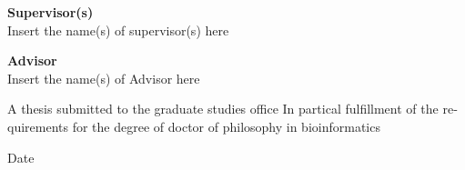 \documentclass[12pt]{report}
\begin{document}
\begin{latin}
{\begin{center}
\textbf{Supervisor(s)\\} Insert the name(s) of supervisor(s) here
\end{center}

\begin{center}
\textbf{Advisor\\} Insert the name(s) of Advisor here
\end{center}

}
\vfill
\begin{center}
{\small A thesis submitted to the graduate studies office In partical fulfillment of the requirements for the degree of doctor of philosophy in bioinformatics}
\end{center}

\begin{center}
Date
\end{center}


\end{latin}
\end{document}
